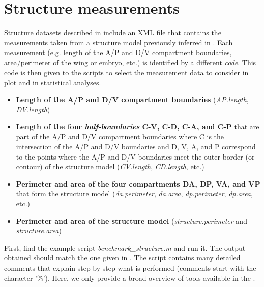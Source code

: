 \section{Structure measurements}\label{sec:matlab_structure}
Structure datasets described in  include an XML file that contains the measurements taken from a structure model previously inferred in . Each measurement (e.g. length of the A/P and D/V compartment boundaries, area/perimeter of the wing or embryo, etc.) is identified by a different \emph{\wingj code}. This code is then given to the \matlab scripts to select the measurement data to consider in plot and in statistical analyses.

\begin{itemize}
 \item \textbf{Length of the A/P and D/V compartment boundaries} (\textit{AP.length}, \textit{DV.length})
 \item \textbf{Length of the four \textit{half-boundaries} C-V, C-D, C-A, and C-P} that are part of the A/P and D/V compartment boundaries where C is the intersection of the A/P and D/V boundaries and D, V, A, and P correspond to the points where the A/P and D/V boundaries meet the outer border (or contour) of the structure model (\textit{CV.length}, \textit{CD.length}, etc.)
 \item \textbf{Perimeter and area of the four compartments DA, DP, VA, and VP} that form the structure model (\textit{da.perimeter}, \textit{da.area}, \textit{dp.perimeter}, \textit{dp.area}, etc.)
 \item \textbf{Perimeter and area of the structure model} (\textit{structure.perimeter} and \textit{structure.area})
\end{itemize}

First, find the example script \textit{benchmark\_structure.m} and run it. The output obtained should match the one given in . The script contains many detailed comments that explain step by step what is performed (comments start with the character '\%'). Here, we only provide a broad overview of tools available in the \wingjMatlab.\\

